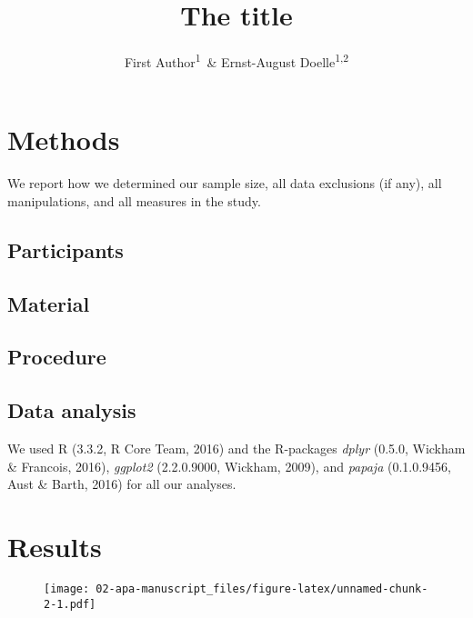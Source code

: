 \documentclass[english,floatsintext,man]{apa6}
\title{The title}
\author{First Author\textsuperscript{1}~\& Ernst-August Doelle\textsuperscript{1,2}}
\affiliation{
    \vspace{0.5cm}
          \textsuperscript{1} Wilhelm-Wundt-University\\
          \textsuperscript{2} Konstanz Business School  }
\begin{document}
\maketitle

\setcounter{secnumdepth}{0}



\section{Methods}\label{methods}

We report how we determined our sample size, all data exclusions (if
any), all manipulations, and all measures in the study.

\subsection{Participants}\label{participants}

\subsection{Material}\label{material}

\subsection{Procedure}\label{procedure}

\subsection{Data analysis}\label{data-analysis}

We used R (3.3.2, R Core Team, 2016) and the R-packages \emph{dplyr}
(0.5.0, Wickham \& Francois, 2016), \emph{ggplot2} (2.2.0.9000, Wickham,
2009), and \emph{papaja} (0.1.0.9456, Aust \& Barth, 2016) for all our
analyses.

\section{Results}\label{results}

\begin{figure}
\centering
\texttt{[image: 02-apa-manuscript\_files/figure-latex/unnamed-chunk-2-1.pdf]}
\caption{}
\end{figure}
\end{document}
